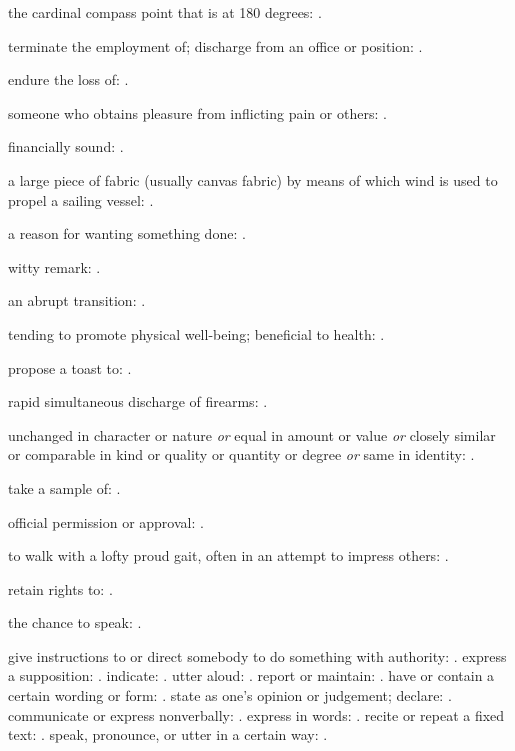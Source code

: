   the cardinal compass point that is at 180 degrees: .

  terminate the employment of; discharge from an office or position: .

  endure the loss of: .

  someone who obtains pleasure from inflicting pain or others: .

  financially sound: .

  a large piece of fabric (usually canvas fabric) by means of which wind is used to propel a sailing vessel: .

  a reason for wanting something done: .

  witty remark: .

  an abrupt transition: .

  tending to promote physical well-being; beneficial to health: .

  propose a toast to: .

  rapid simultaneous discharge of firearms: .

  unchanged in character or nature \textit{or} equal in amount or value \textit{or} closely similar or comparable in kind or quality or quantity or degree \textit{or} same in identity: .

  take a sample of: .

  official permission or approval: .

  to walk with a lofty proud gait, often in an attempt to impress others: .

  retain rights to: .

  the chance to speak: .

  give instructions to or direct somebody to do something with authority: . express a supposition: . indicate: . utter aloud: . report or maintain: . have or contain a certain wording or form: . state as one's opinion or judgement; declare: . communicate or express nonverbally: . express in words: . recite or repeat a fixed text: . speak, pronounce, or utter in a certain way: .


